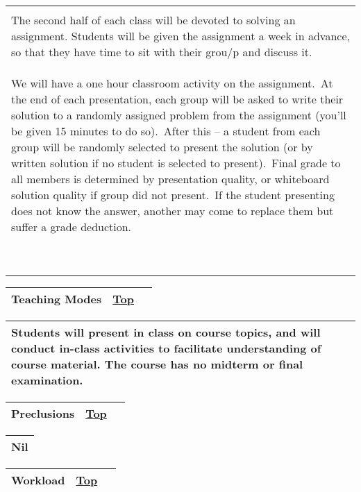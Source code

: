 \begin{longtable}[]{@{}l@{}}
\begin{minipage}[t]{0.97\columnwidth}
\textbf{{Class Activity}}\\
The second half of each class will be devoted to solving an assignment.
Students will be given the assignment a week in advance, so that they
have time to sit with their grou/p and discuss it.~\\
We will have a o{ne hour classroom activity on the assignment.~}{{At the
end of each presentation, each group will be asked to write their
solution to a randomly assigned problem from the assignment (you'll be
given }}{{15 }}{{minutes to do so).~}}{After this -- a student from each
group will be randomly selected to present the solution (or by written
solution if no student is selected to present).~}{{Final grade to all
members is determined by }}{{presentation quality, or whiteboard
solution quality if group did not present}}{{.~}}{If the student
presenting does not know the answer, another may come to replace them
but suffer a grade deduction.}

{{~}}\strut
\end{minipage}\tabularnewline
\bottomrule
\end{longtable}

\begin{longtable}[]{@{}ll@{}}
\toprule
{\protect\hypertarget{Teachingux20Modes}{}{}Teaching Modes} &
{\protect\hyperlink{top}{Top}~~}\tabularnewline
\bottomrule
\end{longtable}

\begin{longtable}[]{@{}l@{}}
\toprule
\protect\hypertarget{ctl00_ctl00_ContentPlaceHolder1_ContentPlaceHolder1_LV_CourseInfo_ctrl3_lblCourseInfo}{}{Students
will present in class on course topics, and will conduct in-class
activities to facilitate understanding of course material. The course
has no midterm or final examination.}\tabularnewline
\bottomrule
\end{longtable}

\begin{longtable}[]{@{}ll@{}}
\toprule
{\protect\hypertarget{Preclusions}{}{}Preclusions} &
{\protect\hyperlink{top}{Top}~~}\tabularnewline
\bottomrule
\end{longtable}

\begin{longtable}[]{@{}l@{}}
\toprule
\protect\hypertarget{ctl00_ctl00_ContentPlaceHolder1_ContentPlaceHolder1_LV_CourseInfo_ctrl4_lblCourseInfo}{}{Nil}\tabularnewline
\bottomrule
\end{longtable}

\begin{longtable}[]{@{}ll@{}}
\toprule
{\protect\hypertarget{Workload}{}{}Workload} &
{\protect\hyperlink{top}{Top}~~}\tabularnewline
\bottomrule
\end{longtable}

